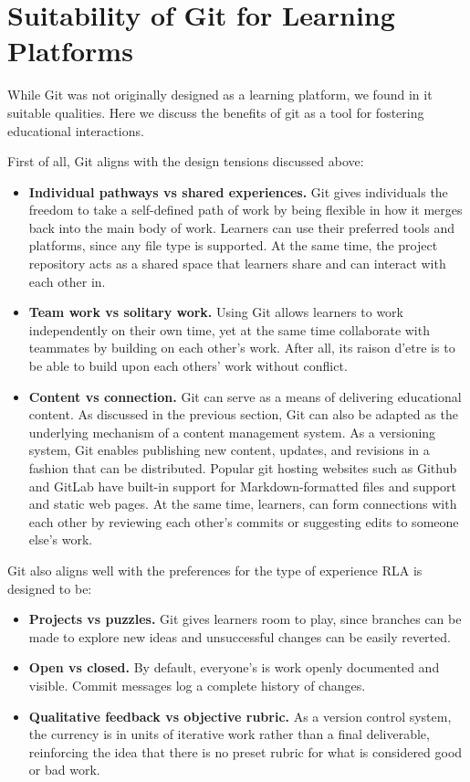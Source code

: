 \documentclass[12pt,twoside]{mitthesis}
\newcommand{\draft}[1]{{\color{blue} #1}}
\begin{document}
\section{Suitability of Git for Learning Platforms}

\draft{While Git was not originally designed as a learning platform, we found in it suitable qualities. Here we discuss the benefits of git as a tool for fostering educational interactions.

First of all, Git aligns with the design tensions discussed above: 
\begin{itemize}
\item \textbf{Individual pathways vs shared experiences.} Git gives individuals the freedom to take a self-defined path of work by being flexible in how it merges back into the main body of work. Learners can use their preferred tools and platforms, since any file type is supported. At the same time, the project repository acts as a shared space that learners share and can interact with each other in.
\item \textbf{Team work vs solitary work.} Using Git allows learners to work independently on their own time, yet at the same time collaborate with teammates by building on each other's work. After all, its raison d'etre is to be able to build upon each others' work without conflict.
\item \textbf{Content vs connection.} Git can serve as a means of delivering educational content. As discussed in the previous section, Git can also be adapted as the underlying mechanism of a content management system. As a versioning system, Git enables publishing new content, updates, and revisions in a fashion that can be distributed. Popular git hosting websites such as Github and GitLab have built-in support for Markdown-formatted files and support and static web pages. At the same time, learners, can form connections with each other by reviewing each other's commits or suggesting edits to someone else's work. 
\end{itemize}

Git also aligns well with the preferences for the type of experience RLA is designed to be:
\begin{itemize}
\item \textbf{Projects vs puzzles.} Git gives learners room to play, since branches can be made to explore new ideas and unsuccessful changes can be easily reverted.  
\item \textbf{Open vs closed.} By default, everyone's is work openly documented and visible. Commit messages log a complete history of changes.
\item \textbf{Qualitative feedback vs objective rubric.} As a version control system, the currency is in units of iterative work rather than a final deliverable, reinforcing the idea that there is no preset rubric for what is considered good or bad work.
\end{itemize}

}
\end{document}
